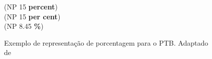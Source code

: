 \begin{figure}[!ht]
    \centering
    \begin{minipage}{5cm}
        (NP 15 \textbf{percent})\\
        (NP 15 \textbf{per cent})\\
        (NP 8.45 \textbf{\%})
    \end{minipage}
    \caption[Exemplo de representação de porcentagem para o PTB]{Exemplo de representação de porcentagem para o PTB. Adaptado de  }
    \label{fig:ptb_percent_guide}
\end{figure}